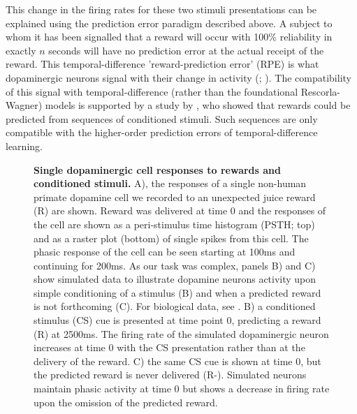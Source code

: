 This change in the firing rates for these two stimuli presentations can be explained using the prediction error paradigm described above. A subject to whom it has been signalled that a reward will occur with 100\% reliability in exactly $n$ seconds will have no prediction error at the actual receipt of the reward. This temporal-difference 'reward-prediction error' (RPE) is what dopaminergic neurons signal with their change in activity (\cite{dardenneBOLDResponsesReflecting2008}; \cite{schultzNeuralSubstratePrediction1997}). The compatibility of this signal with temporal-difference (rather than the foundational Rescorla-Wagner) models is supported by a study by \cite{montagueFrameworkMesencephalicDopamine1996}, who showed that rewards could be predicted from sequences of conditioned stimuli. Such sequences are only compatible with the higher-order prediction errors of temporal-difference learning.

\begin{figure}[p] 
\centering    

\caption[Single dopaminergic cell responses to rewards and conditioned stimuli.]{\textbf{Single dopaminergic cell responses to rewards and conditioned stimuli.} A), the responses of a single non-human primate dopamine cell we recorded to an unexpected juice reward (R) are shown. Reward was delivered at time 0 and the responses of the cell are shown as a peri-stimulus time histogram (PSTH; top) and as a raster plot (bottom) of single spikes from this cell. The phasic response of the cell can be seen starting at 100ms and continuing for 200ms. As our task was complex, panels B) and C) show simulated data to illustrate dopamine neurons activity upon simple conditioning of a stimulus (B) and when a predicted reward is not forthcoming (C). For biological data, see \cite{schultzNeuralSubstratePrediction1997}. B) a conditioned stimulus (CS) cue is presented at time point 0, predicting a reward (R) at 2500ms. The firing rate of the simulated dopaminergic neuron increases at time 0 with the CS presentation rather than at the delivery of the reward. C) the same CS cue is shown at time 0, but the predicted reward is never delivered (R-). Simulated neurons maintain phasic activity at time 0 but shows a decrease in firing rate upon the omission of the predicted reward.}
\label{fig:da_raster}
\end{figure}

